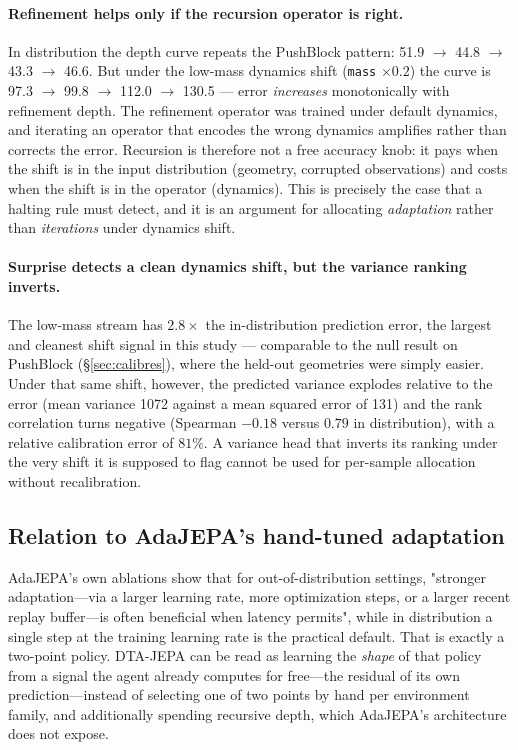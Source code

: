\paragraph{Refinement helps only if the recursion operator is right.} In distribution the depth
curve repeats the PushBlock pattern: 51.9 $\to$ 44.8 $\to$ 43.3 $\to$ 46.6. But under the low-mass dynamics shift
(\texttt{mass} $\times 0.2$) the curve is 97.3 $\to$ 99.8 $\to$ 112.0 $\to$ 130.5 --- error \emph{increases} monotonically with
refinement depth. The refinement operator was trained under default dynamics, and iterating an
operator that encodes the wrong dynamics amplifies rather than corrects the error. Recursion is
therefore not a free accuracy knob: it pays when the shift is in the input distribution
(geometry, corrupted observations) and costs when the shift is in the operator (dynamics). This
is precisely the case that a halting rule must detect, and it is an argument for allocating
\emph{adaptation} rather than \emph{iterations} under dynamics shift.

\paragraph{Surprise detects a clean dynamics shift, but the variance ranking inverts.} The
low-mass stream has $2.8\times$ the in-distribution prediction error, the largest and cleanest
shift signal in this study --- comparable to the null result on PushBlock
(\S\ref{sec:calibres}), where the held-out geometries were simply easier. Under that same
shift, however, the predicted variance explodes relative to the error (mean variance 1072
against a mean squared error of 131) and the rank correlation turns negative
(Spearman $-0.18$ versus $0.79$ in distribution), with a relative calibration error of $81\%$.
A variance head that inverts its ranking under the very shift it is supposed to flag cannot be
used for per-sample allocation without recalibration.

\subsection{Relation to AdaJEPA's hand-tuned adaptation}

AdaJEPA's own ablations show that for out-of-distribution settings, "stronger adaptation---via
a larger learning rate, more optimization steps, or a larger recent replay buffer---is often
beneficial when latency permits", while in distribution a single step at the training learning
rate is the practical default. That is exactly a two-point policy. DTA-JEPA can be read as
learning the \emph{shape} of that policy from a signal the agent already computes for free---the
residual of its own prediction---instead of selecting one of two points by hand per
environment family, and additionally spending recursive depth, which AdaJEPA's architecture
does not expose.

